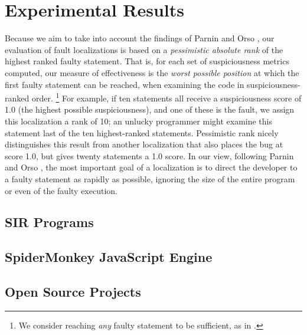 \section{Experimental Results}
\label{sec:experiments}


Because we aim to take into account the findings of Parnin and Orso
\cite{AutoHelp}, our evaluation of fault localizations is based on a
\emph{pessimistic absolute rank} of the highest ranked faulty
statement.  That is, for each set of suspiciousness metrics computed,
our measure of effectiveness is the \emph{worst possible position} at
which the first faulty statement can be reached, when examining the
code in suspiciousness-ranked order.
\footnote{We consider reaching \emph{any} faulty statement to be sufficient, as in \cite{NearNeighbor}.}
For example,
if ten statements all receive a suspiciousness score of 1.0 (the
highest possible suspiciousness), and one of these is the fault, we
assign this localization a rank of 10; an unlucky programmer might
examine this statement last of the ten highest-ranked statements.
Pessimistic rank nicely distinguishes this result from another
localization that also places the bug at score 1.0, but gives twenty
statements a 1.0 score. In our view, following Parnin and Orso
\cite{AutoHelp}, the most important goal of a localization is to
direct the developer to a faulty statement as rapidly as possible,
ignoring the size of the entire program or even of the faulty
execution.  

\subsection{SIR Programs}


\subsection{SpiderMonkey JavaScript Engine}


\subsection{Open Source Projects}
\label{sec:opensource}



